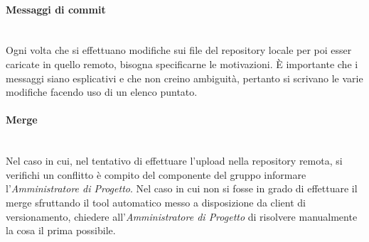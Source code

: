 {\paragraph{Messaggi di commit}\mbox{}\\
Ogni volta che si effettuano modifiche sui file del repository locale per poi esser caricate in
quello remoto, bisogna specificarne le motivazioni. \uppercase{è} importante che i messaggi siano esplicativi e che non creino ambiguità, pertanto si scrivano le varie modifiche facendo uso di un elenco puntato.

\paragraph{Merge}\mbox{}\\
Nel caso in cui, nel tentativo di effettuare l'upload nella repository remota, si verifichi un {conflitto} è compito del componente del gruppo informare l'\textit{Amministratore di Progetto}. Nel caso in cui non si fosse in grado di effettuare il {merge} sfruttando il tool automatico messo a disposizione da client di versionamento, chiedere all'\textit{Amministratore di Progetto} di risolvere manualmente la cosa il prima possibile.


}
